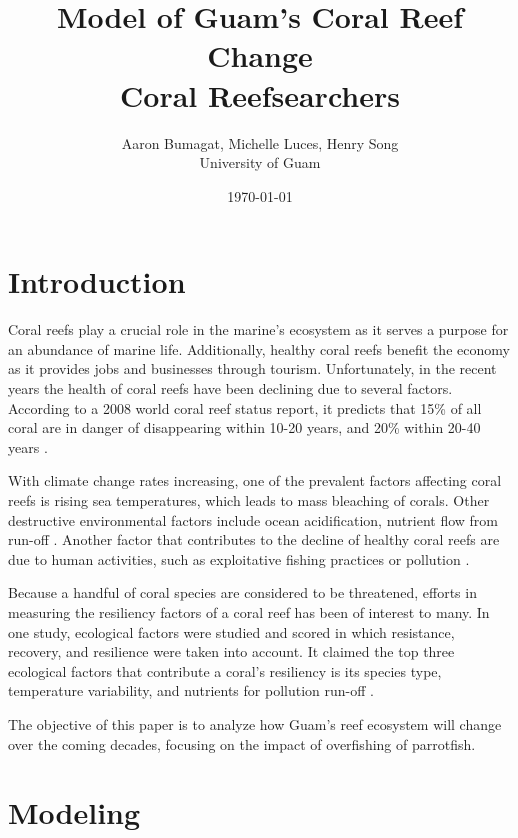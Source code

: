 \documentclass[12pt]{article}
\title{Model of Guam's Coral Reef Change\\Coral Reefsearchers}
\author{Aaron Bumagat, Michelle Luces, Henry Song\\University of Guam}
\date{\today}
\begin{document}
\maketitle

\section{Introduction}
Coral reefs play a crucial role in the marine's ecosystem as it serves a purpose for an abundance of marine life. Additionally, healthy coral reefs benefit the economy as it provides jobs and businesses through tourism. Unfortunately, in the recent years the health of coral reefs have been declining due to several factors. According to a 2008 world coral reef status report, it predicts that 15\% of all coral are in danger of disappearing within 10-20 years, and 20\% within 20-40 years \cite{05_quintero_machuca_cotto_bradley_ríos-soto_2016}. 

With climate change rates increasing, one of the prevalent factors affecting coral reefs is rising sea temperatures, which leads to mass bleaching of corals. Other destructive environmental factors include ocean acidification, nutrient flow from run-off \cite{05_quintero_machuca_cotto_bradley_ríos-soto_2016}. Another factor that contributes to the decline of healthy coral reefs are due to human activities, such as exploitative fishing practices or pollution \cite{04_mathanalysis}. 

Because a handful of coral species are considered to be threatened, efforts in measuring the resiliency factors of a coral reef has been of interest to many. In one study, ecological factors were studied and scored in which resistance, recovery, and resilience were taken into account. It claimed the top three ecological factors that contribute a coral's resiliency is its species type, temperature variability, and nutrients for pollution run-off \cite{02_Riegl_Purkis_Model}. 

The objective of this paper is to analyze how Guam's reef ecosystem will change over the coming decades, focusing on the impact of overfishing of parrotfish. 



\section{Modeling}
\end{document}
